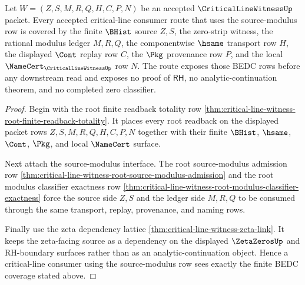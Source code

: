 \begin{theorem}
\label{thm:critical-line-witness-modulus-consumer-coverage}
Let $W=(Z,S,M,R,Q,H,C,P,N)$ be an accepted $\CriticalLineWitnessUp$ packet. Every accepted critical-line consumer route that uses the source-modulus row is covered by the finite $\BHist$ source $Z,S$, the zero-strip witness, the rational modulus ledger $M,R,Q$, the componentwise $\hsame$ transport row $H$, the displayed $\Cont$ replay row $C$, the $\Pkg$ provenance row $P$, and the local $\NameCert_{\CriticalLineWitnessUp}$ row $N$. The route exposes those BEDC rows before any downstream read and exposes no proof of $\mathsf{RH}$, no analytic-continuation theorem, and no completed zero classifier.
\end{theorem}
\begin{proof}
Begin with the root finite readback totality row \autoref{thm:critical-line-witness-root-finite-readback-totality}. It places every root readback on the displayed packet rows $Z,S,M,R,Q,H,C,P,N$ together with their finite $\BHist$, $\hsame$, $\Cont$, $\Pkg$, and local $\NameCert$ surface.

Next attach the source-modulus interface. The root source-modulus admission row \autoref{thm:critical-line-witness-root-source-modulus-admission} and the root modulus classifier exactness row \autoref{thm:critical-line-witness-root-modulus-classifier-exactness} force the source side $Z,S$ and the ledger side $M,R,Q$ to be consumed through the same transport, replay, provenance, and naming rows.

Finally use the zeta dependency lattice \autoref{thm:critical-line-witness-zeta-link}. It keeps the zeta-facing source as a dependency on the displayed $\ZetaZerosUp$ and RH-boundary surfaces rather than as an analytic-continuation object. Hence a critical-line consumer using the source-modulus row sees exactly the finite BEDC coverage stated above.
\end{proof}

